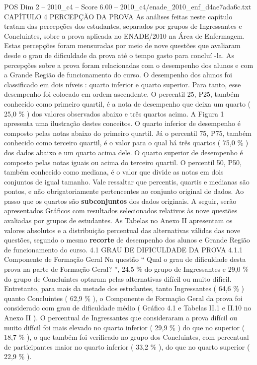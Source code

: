 \begin{textsample}{POS Dim 2 – 2010\_c4 – Score 6.00 – 2010\_c4/enade\_2010\_enf\_d4ae7ada6c.txt}  \label{ex:f2_pos_144}
CAPÍTULO 4 PERCEPÇÃO DA PROVA As análises feitas neste capítulo tratam das percepções dos estudantes, separados por grupos de Ingressantes e Concluintes, sobre a prova aplicada no ENADE/2010 na Área de Enfermagem.
Estas percepções foram mensuradas por meio de nove questões que avaliaram desde o grau de dificuldade da prova até o tempo gasto para concluí -la.
As percepções sobre a prova foram relacionadas com o desempenho dos alunos e com a Grande Região de funcionamento do curso.
O desempenho dos alunos foi classificado em dois níveis : quarto inferior e quarto superior.
Para tanto, esse desempenho foi colocado em ordem ascendente.
O percentil 25, P25, também conhecido como primeiro quartil, é a nota de desempenho que deixa um quarto ( 25,0 \% ) dos valores observados abaixo e três quartos acima.
A Figura 1 apresenta uma ilustração destes conceitos.
O quarto inferior de desempenho é composto pelas notas abaixo do primeiro quartil.
Já o percentil 75, P75, também conhecido como terceiro quartil, é o valor para o qual há três quartos ( 75,0 \% ) dos dados abaixo e um quarto acima dele.
O quarto superior de desempenho é composto pelas notas iguais ou acima do terceiro quartil.
O percentil 50, P50, também conhecido como mediana, é o valor que divide as notas em dois conjuntos de igual tamanho.
Vale ressaltar que percentis, quartis e medianas são pontos, e não obrigatoriamente pertencentes ao conjunto original de dados.
Ao passo que os quartos são \textbf{subconjuntos} dos dados originais.
A seguir, serão apresentados Gráficos com resultados selecionados relativos às nove questões avaliadas por grupos de estudantes.
As Tabelas no Anexo II apresentam os valores absolutos e a distribuição percentual das alternativas válidas das nove questões, segundo o mesmo \textbf{recorte} de desempenho dos alunos e Grande Região de funcionamento do curso. 4.1 GRAU DE DIFICULDADE DA PROVA 4.1.1 Componente de Formação Geral Na questão “ Qual o grau de dificuldade desta prova na parte de Formação Geral? ”, 24,5 \% do grupo de Ingressantes e 29,0 \% do grupo de Concluintes optaram pelas alternativas difícil ou muito difícil.
Entretanto, para mais da metade dos estudantes, tanto Ingressantes ( 64,6 \% ) quanto Concluintes ( 62,9 \% ), o Componente de Formação Geral da prova foi considerado com grau de dificuldade médio ( Gráfico 4.1 e Tabelas II.1 e II.10 no Anexo II ).
O percentual de Ingressantes que consideraram a prova difícil ou muito difícil foi mais elevado no quarto inferior ( 29,9 \% ) do que no superior ( 18,7 \% ), o que também foi verificado no grupo dos Concluintes, com percentual de participantes maior no quarto inferior ( 33,2 \% ), do que no quarto superior ( 22,9 \% ).

\end{textsample}
